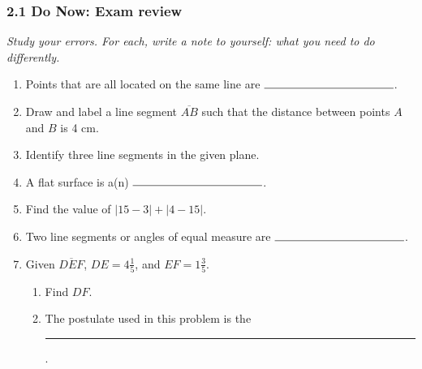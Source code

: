 \documentclass[12pt, twoside]{article}
\begin{document}
  \subsubsection*{2.1 Do Now: Exam review}
  \emph{Study your errors. For each, write a note to yourself: what you need to do differently.}
    \vspace{0.5cm}
  \begin{enumerate}
  \item Points that are all located on the same line are $\rule{4cm}{0.15mm}$.\bigskip

  \item Draw and label a line segment $\overline{AB}$ such that the distance between points $A$ and $B$ is 4 cm. \vspace{2cm}

  \item Identify three line segments in the given plane.\\[0.25in]
     \vspace{1cm}

  \item A flat surface is a(n) $\rule{4cm}{0.15mm}$. \bigskip

  \item Find the value of $|15-3|+|4-15|$. \bigskip

  \item Two line segments or angles of equal measure are $\rule{4cm}{0.15mm}$.
    \bigskip

  \item Given $\overline{DEF}$, $DE=4 \frac{1}{5}$, and $EF=1 \frac{3}{5}$.
  \begin{enumerate}
    \item Find ${DF}$.\\[.5in]
       \bigskip
    \item The postulate used in this problem is the \rule{6cm}{0.15mm}.
  \end{enumerate}


\end{enumerate}
\end{document}
